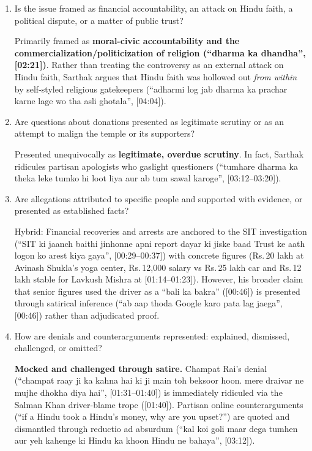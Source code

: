\documentclass[10pt,a4paper]{article}
\begin{document}
\begin{enumerate}[leftmargin=1.5em, itemsep=6pt, topsep=4pt]
  \textbf{People Making Allegations:} Local institutional actors like the Ayodhya ``baar esosieshan'' [Bar Association] threatening a city blockade ([01:48]) are cited alongside ``apojishan ne alag baval kaat diya hai'' [the opposition has raised its own ruckus] ([01:48]).
  \item Is the issue framed as financial accountability, an attack on Hindu faith, a political dispute, or a matter of public trust?\par\smallskip
  Primarily framed as \textbf{moral-civic accountability and the commercialization/politicization of religion (``dharma ka dhandha'', [02:21])}. Rather than treating the controversy as an external attack on Hindu faith, Sarthak argues that Hindu faith was hollowed out \emph{from within} by self-styled religious gatekeepers (``adharmi log jab dharma ka prachar karne lage wo tha asli ghotala'', [04:04]).
  \item Are questions about donations presented as legitimate scrutiny or as an attempt to malign the temple or its supporters?\par\smallskip
  Presented unequivocally as \textbf{legitimate, overdue scrutiny}. In fact, Sarthak ridicules partisan apologists who gaslight questioners (``tumhare dharma ka theka leke tumko hi loot liya aur ab tum sawal karoge'', [03:12--03:20]).
  \item Are allegations attributed to specific people and supported with evidence, or presented as established facts?\par\smallskip
  Hybrid: Financial recoveries and arrests are anchored to the SIT investigation (``SIT ki jaanch baithi jinhonne apni report dayar ki jiske baad Trust ke aath logon ko arest kiya gaya'', [00:29--00:37]) with concrete figures (Rs.\,20 lakh at Avinash Shukla's yoga center, Rs.\,12,000 salary vs Rs.\,25 lakh car and Rs.\,12 lakh stable for Lavkush Mishra at [01:14--01:23]). However, his broader claim that senior figures used the driver as a ``bali ka bakra'' ([00:46]) is presented through satirical inference (``ab aap thoda Google karo pata lag jaega'', [00:46]) rather than adjudicated proof.
  \item How are denials and counterarguments represented: explained, dismissed, challenged, or omitted?\par\smallskip
  \textbf{Mocked and challenged through satire.} Champat Rai's denial (``champat raay ji ka kahna hai ki ji main toh beksoor hoon. mere draivar ne mujhe dhokha diya hai'', [01:31--01:40]) is immediately ridiculed via the Salman Khan driver-blame trope ([01:40]). Partisan online counterarguments (``if a Hindu took a Hindu's money, why are you upset?'') are quoted and dismantled through reductio ad absurdum (``kal koi goli maar dega tumhen aur yeh kahenge ki Hindu ka khoon Hindu ne bahaya'', [03:12]).

\end{enumerate}
\end{document}
